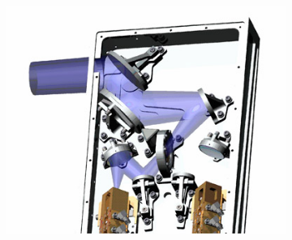 \begin{figure}
    \centering
    \begin{subfigure}[c]{.7\textwidth}
        \includegraphics[width=\textwidth]{lou_band_5_drawing}
    \end{subfigure}%
    \begin{subfigure}[c]{.22\textwidth}

\end{subfigure}
\end{figure}
